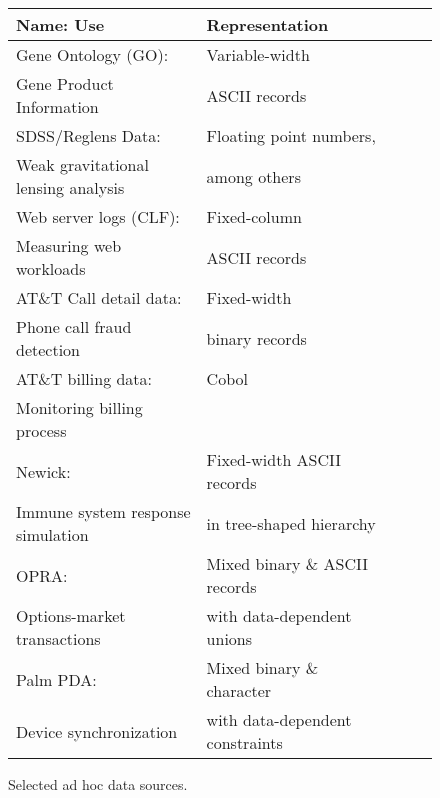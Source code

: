 \documentclass{sigplanconf}
\begin{document}
\begin{figure}
\begin{center}
\scriptsize
\begin{tabular}{@{}|l|l|l|l|l|}
\hline
Name: Use                               & Representation     \\ \hline\hline
Gene Ontology (GO): & Variable-width     \\
Gene Product Information 	           & ASCII records      \\ \hline
SDSS/Reglens Data:  & Floating point numbers,  \\
Weak gravitational lensing analysis     & among others       \\ \hline
Web server logs (CLF):                  & Fixed-column       \\ 
Measuring web workloads                 & ASCII records      \\ \hline
AT\&T Call detail data:                 & Fixed-width        \\
Phone call fraud detection              & binary records     \\ \hline 
AT\&T billing data:                     & Cobol              \\ 
Monitoring billing process              &                    \\ \hline
Newick:                           & Fixed-width ASCII records  \\ 
Immune system response simulation              & in tree-shaped hierarchy   \\ \hline                                
OPRA:                                   & Mixed binary \& ASCII records  \\
Options-market transactions             & with data-dependent unions     \\ \hline
Palm PDA:                               & Mixed binary \& character  \\
Device synchronization                  & with data-dependent constraints \\ \hline
\end{tabular}
\caption{Selected ad hoc data sources.}
\label{figure:data-sources}
\end{center}
\end{figure}
\end{document}
